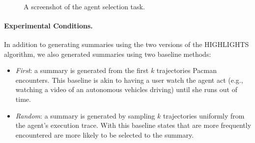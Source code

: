 \begin{figure}[h]
	\centering
    \\
	\caption{A screenshot of the agent selection task.}
	\label{fig:pacman}
	\vspace{-0.4cm}
\end{figure}






\paragraph{Experimental Conditions.} In addition to generating summaries using the two versions of the HIGHLIGHTS algorithm, we also generated summaries using two baseline methods:
\begin{itemize}[leftmargin=.3cm]
\item \emph{First}: a summary is generated from the first $k$ trajectories Pacman encounters. This baseline is akin to having a user watch the agent act (e.g., watching a video of an autonomous vehicles driving) until she runs out of time.
\item \emph{Random}: a summary is generated by sampling $k$ trajectories uniformly from the agent's execution trace. %
With this baseline states that are more frequently encountered are more likely to be selected to the summary. 
\end{itemize}

